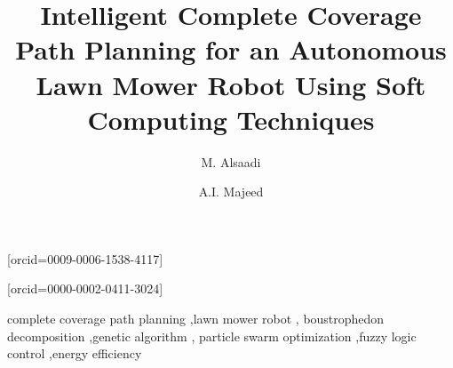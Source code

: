 \documentclass[a4paper,fleqn]{cas-sc}
\begin{document}
\let\WriteBookmarks\relax
\def\floatpagepagefraction{1}
\def\textpagefraction{.001}


\title[mode=title]{Intelligent Complete Coverage Path Planning for an Autonomous Lawn Mower Robot Using Soft Computing Techniques}

\author[1]{M. Alsaadi}[orcid=0009-0006-1538-4117]
\cormark[1]

\author[1]{A.I. Majeed}[orcid=0000-0002-0411-3024]





\begin{keywords}
complete coverage path planning \sep lawn mower robot \sep
boustrophedon decomposition \sep genetic algorithm \sep
particle swarm optimization \sep fuzzy logic control \sep energy efficiency
\end{keywords}

\maketitle














\end{document}
